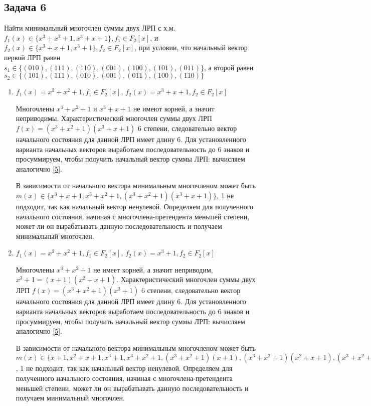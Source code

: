 \documentclass[utf8x, 14pt]{G7-32} %
\begin{document}
\subsection{Задача 6}
Найти минимальный многочлен суммы двух ЛРП с х.м. $f_1(x)\in\{x^3+x^2+1, x^3+x+1\}, f_1\in F_2[x]$, и $f_2(x)\in\{x^3+x+1, x^3+1\}, f_2\in F_2[x]$, при условии, что начальный вектор первой ЛРП равен $s_1 \in \{(010), (111), (110), (001), (100),(101),(011)\}$, а второй равен $s_2 \in\{(101), (111), (010), (001), (011), (100), (110)\}$

\begin{enumerate}
    \item $f_1(x) = x^3+x^2+1, f_1\in F_2[x]$, $f_2(x) = x^3+x+1, f_2\in F_2[x]$
    
     Многочлены $x^3+x^2+1$ и $x^3+x+1$ не имеют корней, а значит неприводимы. Характеристический многочлен суммы двух ЛРП $f(x) = (x^3+x^2+1)(x^3+x+1)$ 6 степени, следовательно вектор начального состояния для данной ЛРП имеет длину 6. Для установленного варианта начальных векторов выработаем последовательность до 6 знаков и просуммируем, чтобы получить начальный вектор суммы ЛРП: вычисляем аналогично \ref{5}.
     
     В зависимости от начального вектора минимальным многочленом может быть $m(x)\in\{x^3+x+1, x^3+x^2+1, (x^3+x^2+1)(x^3+x+1)\}$, 1 не подходит, так как начальный вектор ненулевой. Определяем для полученного начального состояния, начиная с многочлена-претендента меньшей степени, может ли он вырабатывать данную последовательность и получаем минимальный многочлен.
     
     \item $f_1(x) = x^3+x^2+1, f_1\in F_2[x]$, $f_2(x) = x^3+1, f_2\in F_2[x]$
    
     Многочлены $x^3+x^2+1$  не имеет корней, а значит неприводим, $x^3+1 = (x+1)(x^2+x+1)$. Характеристический многочлен суммы двух ЛРП $f(x) = (x^3+x^2+1)(x^3+1)$ 6 степени, следовательно вектор начального состояния для данной ЛРП имеет длину 6. Для установленного варианта начальных векторов выработаем последовательность до 6 знаков и просуммируем, чтобы получить начальный вектор суммы ЛРП: вычисляем аналогично \ref{5}.
     
     В зависимости от начального вектора минимальным многочленом может быть $m(x)\in\{x+1, x^2+x+1, x^3+1, x^3+x^2+1, (x^3+x^2+1)(x+1), (x^3+x^2+1)(x^2+x+1), (x^3+x^2+1)(x^3+1)\}$, 1 не подходит, так как начальный вектор ненулевой. Определяем для полученного начального состояния, начиная с многочлена-претендента меньшей степени, может ли он вырабатывать данную последовательность и получаем минимальный многочлен.
     

\end{enumerate}
\end{document}

